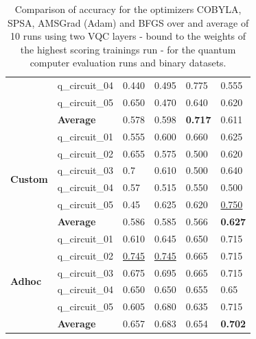 \begin{table}[!h]
{\begin{tabular}{p{}p{}|p{}p{}p{}p{}}
    		                        & q\_circuit\_04 & 0.440  & 0.495 & 0.775    & 0.555 \\
    		                        & q\_circuit\_05 & 0.650  & 0.470 & 0.640   & 0.620 \\
    		\cline{2-6} 
    		                        & \textbf{Average} & 0.578  & 0.598 & \textbf{0.717}    & 0.611 \\
    		\hline
    		\multirow{6}{*}{\textbf{Custom}} & q\_circuit\_01  & 0.555  & 0.600 & 0.660    & 0.625 \\
    		                        & q\_circuit\_02  & 0.655  & 0.575 & 0.500    & 0.620 \\
    		                        & q\_circuit\_03  & 0.7  & 0.610 & 0.500    & 0.640 \\
    		                        & q\_circuit\_04  & 0.57  & 0.515 & 0.550    & 0.500 \\
    		                        & q\_circuit\_05  & 0.45  & 0.625 & 0.620    & \underline{0.750} \\
    		\cline{2-6} 
    		                        & \textbf{Average} & 0.586  & 0.585 & 0.566    & \textbf{0.627} \\
    		\hline 
    		\multirow{6}{*}{\textbf{Adhoc}}  & q\_circuit\_01  & 0.610  & 0.645 & 0.650    & 0.715 \\
    		                        & q\_circuit\_02 & \underline{0.745}  & \underline{0.745} & 0.665    & 0.715 \\
    		                        & q\_circuit\_03 & 0.675  & 0.695 & 0.665    & 0.715 \\
    		                        & q\_circuit\_04 & 0.650  & 0.650 & 0.655    & 0.65 \\
    		                        & q\_circuit\_05 & 0.605  & 0.680 & 0.635    & 0.715 \\
    		\cline{2-6} 
    		                        & \textbf{Average} & 0.657  & 0.683 & 0.654    & \textbf{0.702} \\
    		\hline 
    	\end{tabular}
    }
	\caption{Comparison of accuracy for the optimizers COBYLA, SPSA, AMSGrad (Adam) and BFGS over and average of 10 runs using two VQC layers - bound to the weights of the highest scoring trainings run - for the quantum computer evaluation runs and binary datasets.}
	\label{table:accuracy_comparison_binary_dataset_and_optimizers_evaluation_runs}
\end{table}

\clearpage

